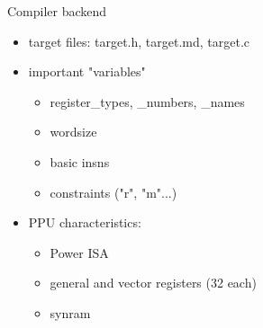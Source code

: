 \documentclass[10pt]{beamer}
\begin{document}
\begin{frame}[fragile]{Compiler backend}
	\begin{itemize}
		\item target files: target.h, target.md, target.c
		\item important "variables"
			\begin{itemize}
				\item register\_types, \_numbers, \_names
				\item wordsize
				\item basic insns
				\item constraints ("r", "m"...)
			\end{itemize}
		\item PPU characteristics:
			\begin{itemize}
				\item Power ISA
				\item general and vector registers (32 each)
				\item synram
			\end{itemize}
 	\end{itemize}
\end{frame}
\end{document}

